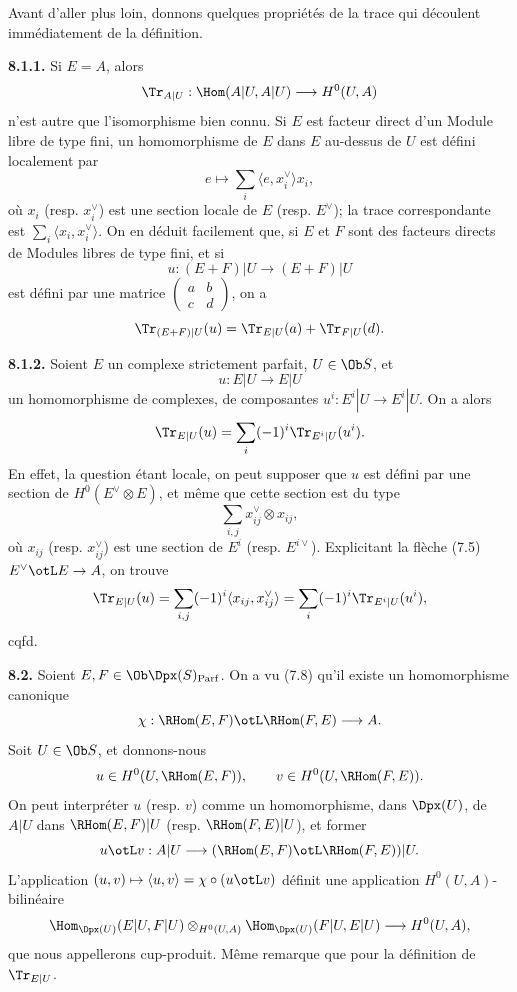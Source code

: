 \documentclass[11pt]{article}
\newcommand{\Parf}{\operatorname{Parf}}
\begin{document}
Avant d'aller plus loin, donnons quelques propriétés de la trace qui découlent immédiatement de la définition.

\textbf{8.1.1.} Si \(E=A\), alors
\[
  \Tr_{A|U}:\Hom(A|U,A|U)\longrightarrow H^0(U,A)
\]
n'est autre que l'isomorphisme bien connu. Si \(E\) est facteur direct d'un Module libre de type fini, un homomorphisme de \(E\) dans \(E\) au-dessus de \(U\) est défini localement par
\[
  e\longmapsto \sum_i\langle e,x_i^\vee\rangle x_i,
\]
où \(x_i\) (resp. \(x_i^\vee\)) est une section locale de \(E\) (resp. \(E^\vee\)); la trace correspondante est \(\sum_i\langle x_i,x_i^\vee\rangle\). On en déduit facilement que, si \(E\) et \(F\) sont des facteurs directs de Modules libres de type fini, et si
\[
  u:(E+F)|U\longrightarrow(E+F)|U
\]
est défini par une matrice \(\begin{pmatrix}a&b\\ c&d\end{pmatrix}\), on a
\[
  \Tr_{(E+F)|U}(u)=\Tr_{E|U}(a)+\Tr_{F|U}(d).
\]

\textbf{8.1.2.} Soient \(E\) un complexe strictement parfait, \(U\in\Ob S\), et
\[
  u:E|U\longrightarrow E|U
\]
un homomorphisme de complexes, de composantes \(u^i:E^i|U\to E^i|U\). On a alors
\[
  \Tr_{E|U}(u)=\sum_i(-1)^i\Tr_{E^i|U}(u^i).
\]
En effet, la question étant locale, on peut supposer que \(u\) est défini par une section de \(H^0(E^\vee\otimes E)\), et même que cette section est du type
\[
  \sum_{i,j}x_{ij}^\vee\otimes x_{ij},
\]
où \(x_{ij}\) (resp. \(x_{ij}^\vee\)) est une section de \(E^i\) (resp. \(E^{i\vee}\)). Explicitant la flèche (7.5) \(E^\vee\otL E\to A\), on trouve
\[
  \Tr_{E|U}(u)=\sum_{i,j}(-1)^i\langle x_{ij},x_{ij}^\vee\rangle
  =\sum_i(-1)^i\Tr_{E^i|U}(u^i),
\]
cqfd.

\textbf{8.2.} Soient \(E,F\in\Ob\Dpx(S)_{\Parf}\). On a vu (7.8) qu'il existe un homomorphisme canonique
\[
  \chi:\RHom(E,F)\otL\RHom(F,E)\longrightarrow A.
\]
Soit \(U\in\Ob S\), et donnons-nous
\[
  u\in H^0(U,\RHom(E,F)),\qquad v\in H^0(U,\RHom(F,E)).
\]
On peut interpréter \(u\) (resp. \(v\)) comme un homomorphisme, dans \(\Dpx(U)\), de \(A|U\) dans \(\RHom(E,F)|U\) (resp. \(\RHom(F,E)|U\)), et former
\[
  u\otL v:A|U\longrightarrow(\RHom(E,F)\otL\RHom(F,E))|U.
\]
L'application \((u,v)\mapsto\langle u,v\rangle=\chi\circ(u\otL v)\) définit une application \(H^0(U,A)\)-bilinéaire
\[
  \Hom_{\Dpx(U)}(E|U,F|U)\otimes_{H^0(U,A)}\Hom_{\Dpx(U)}(F|U,E|U)
  \longrightarrow H^0(U,A),
\]
que nous appellerons cup-produit. Même remarque que pour la définition de \(\Tr_{E|U}\).
\end{document}

